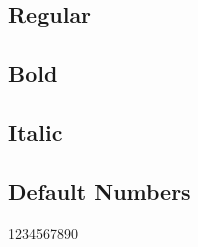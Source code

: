 \documentclass{article}
\begin{document}
\subsection*{Regular}
\lipsum[1]


\subsection*{Bold}

\textbf{\lipsum[2]}

\subsection*{Italic}

\textit{\lipsum[3]}

\subsection*{Default Numbers}

1234567890
\end{document}
